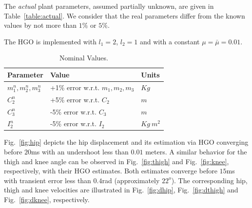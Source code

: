 \documentclass[letterpaper, 10 pt, conference]{ieeeconf}  %
\theoremstyle{plain}
\theoremstyle{definition}
\theoremstyle{remark}
\begin{document}
The {\em actual} plant parameters, assumed partially unknown, are given in Table~\ref{table:actual}. We consider that  the real parameters differ from the known values by not more than $1\%$ or $5\%$. 


The HGO is implemented with $l_1=2$, $l_2=1$ and with a constant $\mu=\bar{\mu}=0.01$.
%
\begin{table}[h!]
\centering
\caption{Nominal Values.} 
\begin{tabular}{ |p{2cm} p{3.5cm} p{1cm}|  }
 \hline
 Parameter & Value & Units\\
 \hline
	$m_1^n,m_2^n, m_3^n$ & +1\% error w.r.t. $m_1,m_2, m_3$ & $Kg$\\
	$C_2^n$ & +5\% error w.r.t. $C_2$ & $m$\\
	$C_3^n$ & -5\% error  w.r.t. $C_3$  & $m$\\
	$I_2^n$ & -5\% error  w.r.t. $I_2$  & $Kg \ m^2$ \\
\hline
\end{tabular}
\label{table:nominal}
\end{table}
%
Fig.~\ref{fig:hip} depicts the hip displacement and its estimation via HGO converging before $20$ms with an undershoot less than $0.01$ meters. A similar behavior for the thigh and knee angle can be observed in Fig.~\ref{fig:thigh} and Fig.~\ref{fig:knee}, respectively, with their HGO estimates. Both estimates converge before $15$ms with transient error less than $0.4$rad (approximately  $22^o$). The corresponding hip, thigh and knee velocities are illustrated in Fig.~\ref{fig:dhip}, Fig.~\ref{fig:dthigh} and Fig.~\ref{fig:dknee}, respectively. 
%
%
%
%
%
%
%
%
%
\end{document}
